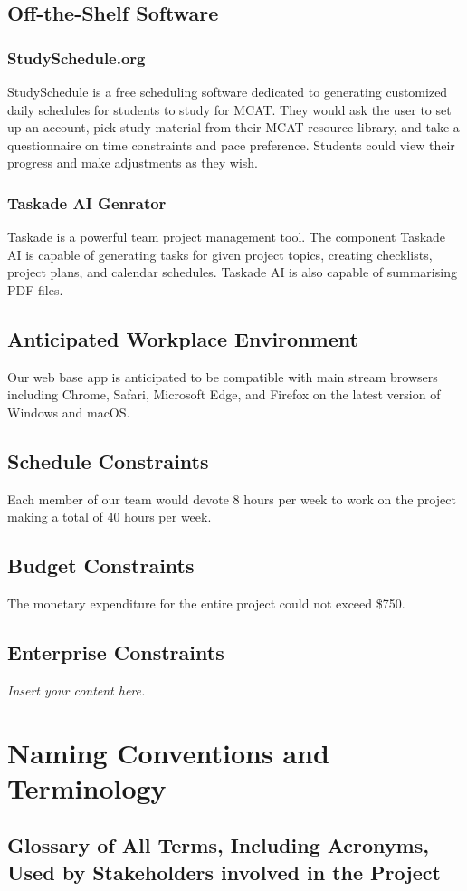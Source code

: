 \documentclass[12pt]{article}
\newcommand{\lips}{\textit{Insert your content here.}}
\begin{document}
\subsection{Off-the-Shelf Software}
\subsubsection{StudySchedule.org}
StudySchedule is a free scheduling software dedicated to generating customized daily schedules for students to study for MCAT. They would ask the user to set up an account, pick study material from their MCAT resource library, and take a questionnaire on time constraints and pace preference. Students could view their progress and make adjustments as they wish.
\subsubsection{Taskade AI Genrator}
Taskade is a powerful team project management tool. The component Taskade AI is capable of generating tasks for given project topics, creating checklists, project plans, and calendar schedules. Taskade AI is also capable of summarising PDF files.
\subsection{Anticipated Workplace Environment}
Our web base app is anticipated to be compatible with main stream browsers including Chrome, Safari, Microsoft Edge, and Firefox on the latest version of Windows and macOS.
\subsection{Schedule Constraints}
Each member of our team would devote 8 hours per week to work on the project making a total of 40 hours per week.
\subsection{Budget Constraints}
The monetary expenditure for the entire project could not exceed \$750.
\subsection{Enterprise Constraints}
\lips

\section{Naming Conventions and Terminology}
\subsection{Glossary of All Terms, Including Acronyms, Used by Stakeholders
involved in the Project}
\end{document}
